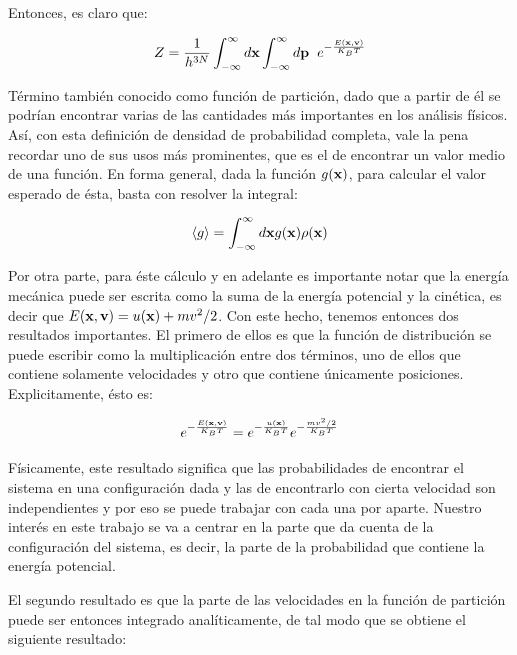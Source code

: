 \documentclass [11pt]{article}
\begin{document}
Entonces, es claro que:

\begin{equation}
    Z= \frac{1}{h^{3N}}\int_{-\infty}^{\infty}d{\bf x} \int_{-\infty}^{\infty}d{\bf p}{\hspace{0.2 cm}}e^{-\frac{E({\bf x},{\bf v})}{K_BT}}
\end{equation}

Término también conocido como función de partición, dado que a partir de él se podrían encontrar varias de las cantidades más importantes en los análisis físicos. \\

Así, con esta definición de densidad de probabilidad completa, vale la pena recordar uno de sus usos más prominentes, que es el de encontrar un valor medio de una función. En forma general, dada la función $g({\bf x})$, para calcular el valor esperado de ésta, basta con resolver la integral:

\begin{equation}
    \langle g\rangle=\int_{-\infty}^{\infty} d{\bf x} g({\bf x}) \rho({\bf x})
\end{equation}

Por otra parte, para éste cálculo y en adelante es importante notar que la energía mecánica puede ser escrita como la suma de la energía potencial y la cinética, es decir que $E({\bf x},{\bf v})= u({\bf x})+m v^2/2$. Con este hecho, tenemos entonces dos resultados importantes. El primero de ellos es que la función de distribución se puede escribir como la multiplicación entre dos términos, uno de ellos que contiene solamente velocidades y otro que contiene únicamente posiciones. Explicitamente, ésto es:

\begin{equation}
    e^{-\frac{E({\bf x},{\bf v})}{K_BT}}=e^{-\frac{u({\bf x})}{K_BT}}e^{-\frac{m v^2/2}{K_BT}}
\end{equation}

 Físicamente, este resultado significa que las probabilidades de encontrar el sistema en una configuración dada y las de encontrarlo con cierta velocidad son independientes y por eso se puede trabajar con cada una por aparte. Nuestro interés en este trabajo se va a centrar en la parte que da cuenta de la configuración del sistema, es decir, la parte de la probabilidad que contiene la energía potencial. 
 
 El segundo resultado es que la parte de las velocidades en la función de partición puede ser entonces integrado analíticamente, de tal modo que se obtiene el siguiente resultado:
\end{document}
